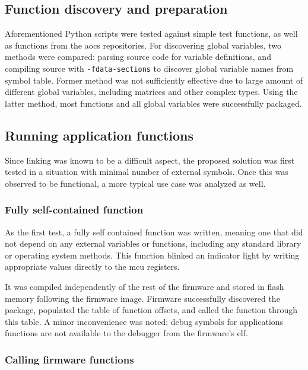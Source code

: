 \subsection{Function discovery and preparation}

Aforementioned Python scripts were tested against simple test functions, as well as functions from the \gls{aocs} repositories. For discovering global variables, two methods were compared: parsing source code for variable definitions, and compiling source with \texttt{-fdata-sections} to discover global variable names from symbol table. Former method was not sufficiently effective due to large amount of different global variables, including matrices and other complex types. Using the latter method, most functions and all global variables were successfully packaged.

\subsection{Running application functions}

Since linking was known to be a difficult aspect, the proposed solution was first tested in a situation with minimal number of external symbols. Once this was observed to be functional, a more typical use case was analyzed as well.

\subsubsection{Fully self-contained function}

As the first test, a fully self contained function was written, meaning one that did not depend on any external variables or functions, including any standard library or operating system methods. This function blinked an indicator light by writing appropriate values directly to the \gls{mcu} registers.

It was compiled independently of the rest of the firmware and stored in flash memory following the firmware image. Firmware successfully discovered the package, populated the table of function offsets, and called the function through this table. A minor inconvenience was noted: debug symbols for applications functions are not available to the debugger from the firmware's \gls{elf}.

\subsubsection{Calling firmware functions}

